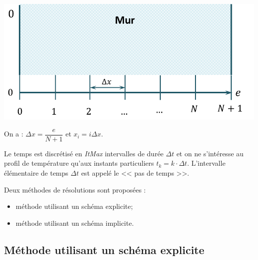 \documentclass[10pt,fleqn]{article} %
\begin{document}
\begin{multicols}{2}
\begin{multicols}{2}
\begin{center}
\includegraphics[width=\linewidth]{images/figure_02}
\end{center}


On a : $\Delta x = \dfrac{e}{N+1}$ et $x_i = i \Delta x$.

%
%
%
%
%
Le temps est discrétisé en \textit{ItMax} intervalles de durée $\Delta t$ et on ne s'intéresse 
au profil de température qu'aux instants particuliers $t_k = k \cdot \Delta t$. 
L'intervalle élémentaire de temps $\Delta t$ est appelé le << pas de temps >>.

\noindent
Deux méthodes de résolutions sont proposées : 
\begin{itemize}
\item méthode utilisant un schéma explicite;
\item méthode utilisant un schéma implicite.
\end{itemize}

\subsection*{Méthode utilisant un schéma explicite}


\end{multicols}
\end{multicols}
\end{document}

